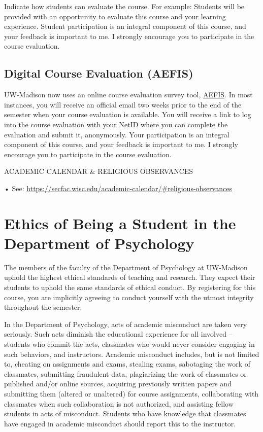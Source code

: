 \documentclass[11pt,man]{article}
\begin{document}
Indicate how students can evaluate the course. For example: Students
will be provided with an opportunity to evaluate this course and your
learning experience. Student participation is an integral component of
this course, and your feedback is important to me. I strongly encourage
you to participate in the course evaluation.

\hypertarget{digital-course-evaluation-aefis}{%
\subsection{Digital Course Evaluation
(AEFIS)}\label{digital-course-evaluation-aefis}}

UW-Madison now uses an online course evaluation survey tool,
\href{https://assessment.provost.wisc.edu/course-evaluation-surveys/}{AEFIS}.
In most instances, you will receive an official email two weeks prior to
the end of the semester when your course evaluation is available. You
will receive a link to log into the course evaluation with your NetID
where you can complete the evaluation and submit it, anonymously. Your
participation is an integral component of this course, and your feedback
is important to me. I strongly encourage you to participate in the
course evaluation.

ACADEMIC CALENDAR \& RELIGIOUS OBSERVANCES

• See:
\url{https://secfac.wisc.edu/academic-calendar/\#religious-observances}

\hypertarget{ethics-of-being-a-student-in-the-department-of-psychology}{%
\section{Ethics of Being a Student in the Department of
Psychology}\label{ethics-of-being-a-student-in-the-department-of-psychology}}

The members of the faculty of the Department of Psychology at UW-Madison
uphold the highest ethical standards of teaching and research. They
expect their students to uphold the same standards of ethical conduct.
By registering for this course, you are implicitly agreeing to conduct
yourself with the utmost integrity throughout the semester.

In the Department of Psychology, acts of academic misconduct are taken
very seriously. Such acts diminish the educational experience for all
involved -- students who commit the acts, classmates who would never
consider engaging in such behaviors, and instructors. Academic
misconduct includes, but is not limited to, cheating on assignments and
exams, stealing exams, sabotaging the work of classmates, submitting
fraudulent data, plagiarizing the work of classmates or published and/or
online sources, acquiring previously written papers and submitting them
(altered or unaltered) for course assignments, collaborating with
classmates when such collaboration is not authorized, and assisting
fellow students in acts of misconduct. Students who have knowledge that
classmates have engaged in academic misconduct should report this to the
instructor.
\end{document}
